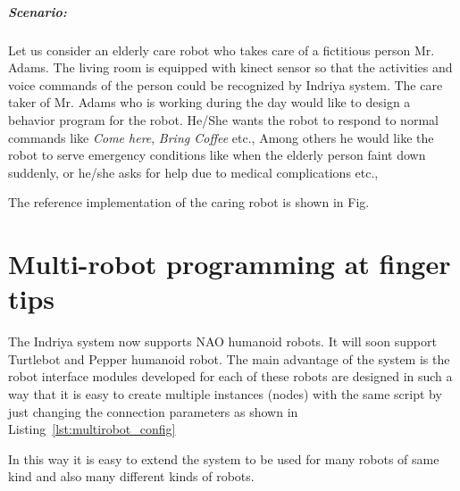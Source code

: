 \subparagraph{Scenario:}Let us consider an elderly care robot who takes care of a fictitious person Mr. Adams. The living room is equipped with kinect sensor so that the activities and voice commands of the person could be recognized by Indriya system. The care taker of Mr. Adams who is working during the day would like to design a behavior program for the robot. He/She wants the robot to respond to normal commands like \emph{Come here}, \emph{Bring Coffee} etc., Among others he would like the robot to serve emergency conditions like when the elderly person faint down suddenly, or he/she asks for help due to medical complications etc.,

The reference implementation of the caring robot is shown in Fig.~

\section{Multi-robot programming at finger tips}
The Indriya system now supports NAO humanoid robots. It will soon support Turtlebot and Pepper humanoid robot. The main advantage of the system is the robot interface modules developed for each of these robots are designed in such a way that it is easy to create multiple instances (nodes) with the same script by just changing the connection parameters as shown in Listing~\ref{lst:multirobot_config}

In this way it is easy to extend the system to be used for many robots of same kind and also many different kinds of robots. 
